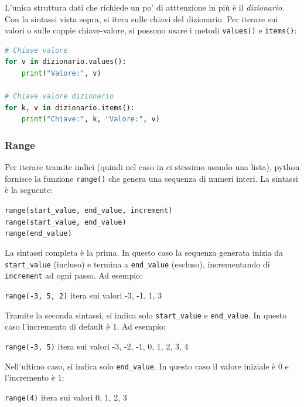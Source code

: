L'unica struttura dati che richiede un po' di atttenzione in più è il \textit{dizionario}. Con la sintassi vista sopra, si itera sulle chiavi del dizionario. Per iterare sui valori o sulle coppie chiave-valore, si possono usare i metodi \texttt{values()} e \texttt{items()}:
\begin{lstlisting}[language = python, frame = none]
# Chiave valore
for v in dizionario.values():
    print("Valore:", v)

# Chiave valore dizionario
for k, v in dizionario.items():
    print("Chiave:", k, "Valore:", v)
\end{lstlisting}

\subsubsection{Range}
Per iterare tramite indici (quindi nel caso in ci stessimo usando una lista), python fornisce la funzione \texttt{range()} che genera una sequenza di numeri interi. La sintassi è la seguente:
\begin{center}
	\verb|range(start_value, end_value, increment)| \\
	\verb|range(start_value, end_value)|\\
	\verb|range(end_value)|
\end{center}
La sintassi completa è la prima. In questo caso la sequenza generata inizia da \verb|start_value| (incluso) e termina a \verb|end_value| (escluso), incrementando di \verb|increment| ad ogni passo. Ad esempio:
\begin{center}
	\verb|range(-3, 5, 2)| itera sui valori -3, -1, 1, 3
\end{center}
Tramite la seconda sintassi, si indica solo \verb|start_value| e \verb|end_value|. In questo caso l'incremento di default è 1. Ad esempio:
\begin{center}
	\verb|range(-3, 5)| itera sui valori -3, -2, -1, 0, 1, 2, 3, 4
\end{center}
Nell'ultimo caso, si indica solo \verb|end_value|. In questo caso il valore iniziale è 0 e l'incremento è 1:
\begin{center}
	\verb|range(4)| itera sui valori 0, 1, 2, 3
\end{center}

\begin{center}
\end{center}




